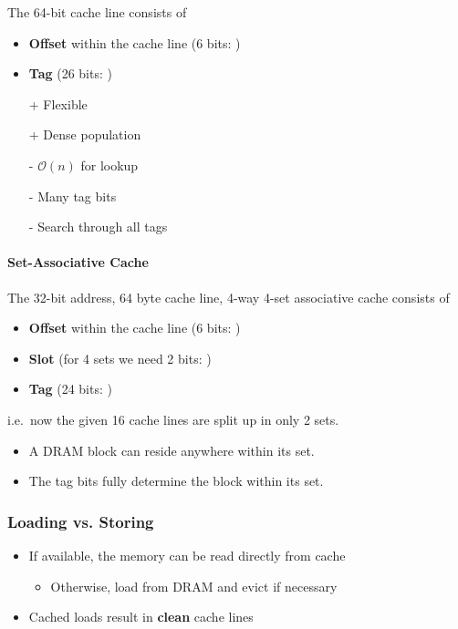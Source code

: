 \newpar{}
The 64-bit cache line consists of
\begin{itemize}
    \item \textbf{Offset} within the cache line (6 bits: )
    \item \textbf{Tag} (26 bits: )
\end{itemize}

\newpar{}
\begin{itemize}
    \item[+] Flexible
    \item[+] Dense population
    \item[-] $\mathcal{O}(n)$ for lookup
    \item[-] Many tag bits
    \item[-] Search through all tags
\end{itemize}

\paragraph{Set-Associative Cache}


The 32-bit address, 64 byte cache line, 4-way 4-set associative cache consists of
\begin{itemize}
    \item \textbf{Offset} within the cache line (6 bits: )
    \item \textbf{Slot} (for 4 sets we need 2 bits: )
    \item \textbf{Tag} (24 bits: )
\end{itemize}
i.e.\ now the given 16 cache lines are split up in only 2 sets. 
\begin{itemize}
    \item A DRAM block can reside anywhere within its set.
    \item The tag bits fully determine the block within its set.
\end{itemize}

\subsubsection{Loading vs. Storing}
\begin{itemize}
    \item If available, the memory can be read directly from cache
    \begin{itemize}
        \item Otherwise, load from DRAM and evict if necessary
    \end{itemize}
    \item Cached loads result in \textbf{clean} cache lines
\end{itemize}

